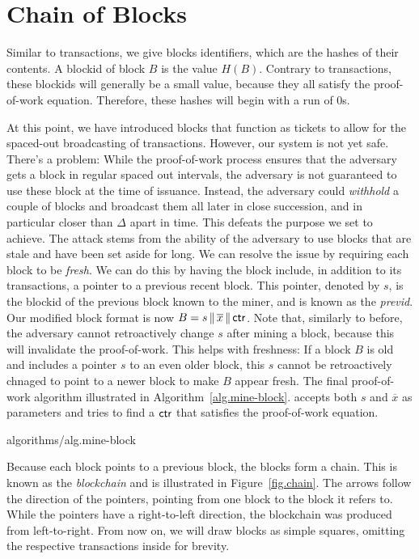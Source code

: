 \section{Chain of Blocks}

Similar to transactions, we give blocks identifiers, which are the hashes of their contents.
A blockid of block $B$ is the value $H(B)$. Contrary to transactions, these blockids will
generally be a small value, because they all satisfy the proof-of-work equation. Therefore,
these hashes will begin with a run of $0$s.

At this point, we have introduced blocks that function as tickets to allow for the spaced-out
broadcasting of transactions. However, our system is not yet safe. There's a problem: While
the proof-of-work process ensures that the adversary gets a block in regular spaced out
intervals, the adversary is not guaranteed to use these block at the time of issuance.
Instead, the adversary could \emph{withhold} a couple of blocks and broadcast them all later
in close succession, and in particular closer than $\Delta$ apart in time. This defeats the
purpose we set to achieve. The attack stems from the ability of the adversary to use blocks
that are stale and have been set aside for long. We can resolve the issue by requiring
each block to be \emph{fresh}. We can do this by having the block include, in addition to
its transactions, a pointer to a previous recent block. This pointer, denoted by $s$,
is the blockid of the previous block known to the miner, and is known as the \emph{previd}.
Our modified block format is now $B = s \,\|\, \overline{x} \,\|\, \mathsf{ctr}$. Note that,
similarly to before, the adversary cannot retroactively change $s$ after mining a block,
because this will invalidate the proof-of-work. This helps with freshness: If a block $B$ is
old and includes a pointer $s$ to an even older block, this $s$ cannot be retroactively
chnaged to point to a newer block to make $B$ appear fresh. The final proof-of-work algorithm
illustrated in Algorithm~\ref{alg.mine-block}.
accepts both $s$ and $\overline{x}$ as parameters and tries to find a $\mathsf{ctr}$ that
satisfies the proof-of-work equation.

{algorithms/alg.mine-block}

Because each block points to a previous block, the blocks form a chain. This is known
as the \emph{blockchain} and is illustrated in Figure~\ref{fig.chain}.
The arrows follow the direction of the pointers, pointing from one block to the block
it refers to. While the pointers have a right-to-left direction, the blockchain was
produced from left-to-right. From now on, we will draw blocks as simple squares,
omitting the respective transactions inside for brevity.

